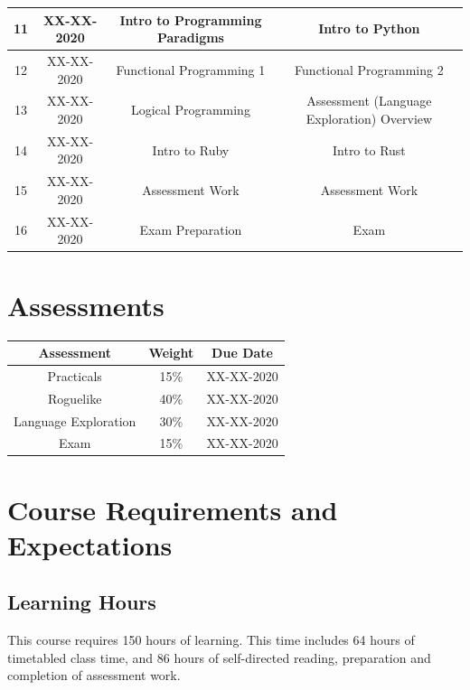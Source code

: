 \documentclass{article}
\begin{document}
\begin{tabular}{|c|c|c|c|}
  11            & XX-XX-2020    & Intro to Programming Paradigms & Intro to Python                            \\ \hline
  12            & XX-XX-2020    & Functional Programming 1       & Functional Programming 2                   \\ \hline
  13            & XX-XX-2020    & Logical Programming            & Assessment (Language Exploration) Overview \\ \hline
  14            & XX-XX-2020    & Intro to Ruby                  & Intro to Rust                              \\ \hline
  15            & XX-XX-2020    & Assessment Work                & Assessment Work                            \\ \hline
  16            & XX-XX-2020    & Exam Preparation               & Exam                                       \\ \hline
\end{tabular}

\section*{Assessments}
\renewcommand{\arraystretch}{1.5}
\begin{tabular}{|c|c|c|}
  \hline
  \textbf{Assessment}  & \textbf{Weight} & \textbf{Due Date} \\ \hline
  Practicals           & 15\%            & XX-XX-2020        \\ \hline
  Roguelike            & 40\%            & XX-XX-2020        \\ \hline
  Language Exploration & 30\%            & XX-XX-2020        \\ \hline
  Exam                 & 15\%            & XX-XX-2020        \\ \hline
\end{tabular}

\section*{Course Requirements and Expectations}

\subsection*{Learning Hours}
This course requires 150 hours of learning. This time includes 64 hours of timetabled class time, and 86 hours of self-directed reading, preparation and completion of assessment work.
\end{document}
